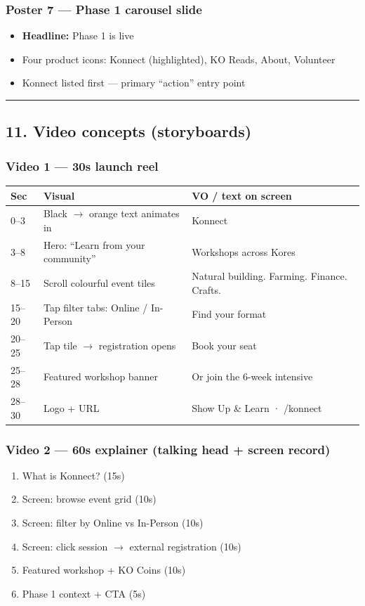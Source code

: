 \documentclass[11pt,a4paper]{report}
\begin{document}
\subsubsection{Poster 7 --- Phase 1 carousel slide}
\begin{itemize}
  \item \textbf{Headline:} Phase 1 is live
  \item Four product icons: Konnect (highlighted), KO Reads, About, Volunteer
  \item Konnect listed first --- primary “action” entry point
\end{itemize}

\medskip\hrule\medskip

\subsection{11. Video concepts (storyboards)}

\subsubsection{Video 1 --- 30s launch reel}
\begin{longtable}{|l|l|l|}
\hline
Sec & Visual & VO / text on screen \\ \hline
0--3 & Black $\rightarrow$ orange text animates in & Konnect \\ \hline
3--8 & Hero: “Learn from your community” & Workshops across Kores \\ \hline
8--15 & Scroll colourful event tiles & Natural building. Farming. Finance. Crafts. \\ \hline
15--20 & Tap filter tabs: Online / In-Person & Find your format \\ \hline
20--25 & Tap tile $\rightarrow$ registration opens & Book your seat \\ \hline
25--28 & Featured workshop banner & Or join the 6-week intensive \\ \hline
28--30 & Logo + URL & Show Up \& Learn · /konnect \\
\hline
\end{longtable}


\subsubsection{Video 2 --- 60s explainer (talking head + screen record)}
\begin{enumerate}
  \item What is Konnect? (15s)
  \item Screen: browse event grid (10s)
  \item Screen: filter by Online vs In-Person (10s)
  \item Screen: click session $\rightarrow$ external registration (10s)
  \item Featured workshop + KO Coins (10s)
  \item Phase 1 context + CTA (5s)
\end{enumerate}
\end{document}
